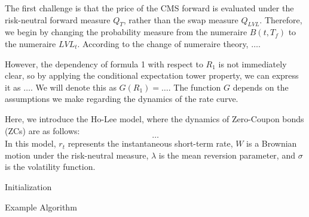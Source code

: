 The first challenge is that the price of the CMS forward is evaluated under the risk-neutral forward measure \(Q_{T}\), 
rather than the swap measure \(Q_{LVL}\). Therefore, we begin by changing the probability measure from the numeraire \(B(t, T_f)\) 
to the numeraire \(LVL_t\). According to the change of numeraire theory, \( \ldots \). 

However, the dependency of formula 1 with respect to \(R_1\) is not immediately clear, so by applying the conditional expectation tower 
property, we can express it as \( \ldots \). We will denote this as \(G(R_1) = \ldots \). The function \(G\) depends on the assumptions we 
make regarding the dynamics of the rate curve.

Here, we introduce the Ho-Lee model, where the dynamics of Zero-Coupon bonds (ZCs) are as follows:
\[ \ldots \]
In this model, \(r_t\) represents the instantaneous short-term rate, \(W\) is a Brownian motion under the risk-neutral measure, \(\lambda\) 
is the mean reversion parameter, and \(\sigma\) is the volatility function.


\begin{algorithm}[H]
    \SetAlgoLined
    Initialization\;
    \caption{Example Algorithm}
\end{algorithm}


